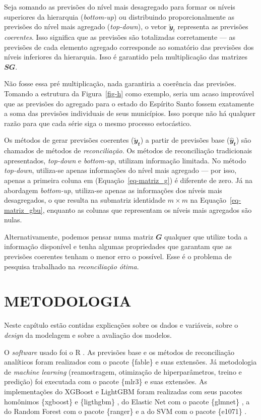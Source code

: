 \documentclass[
  12pt,
  twoside,
  openright,
  a4paper,
  chapter=TITLE,
  section=TITLE,
  brazil]{abntex2}
\begin{document}
Seja somando as previsões do nível mais desagregado para formar os
níveis superiores da hierarquia (\emph{bottom-up}) ou distribuindo
proporcionalmente as previsões do nível mais agregado (\emph{top-down}),
o vetor \(\mathbfit{\tilde{y}}_t\) representa as previsões
\emph{coerentes}. Isso significa que as previsões são totalizadas
corretamente --- as previsões de cada elemento agregado corresponde ao
somatório das previsões dos níveis inferiores da hierarquia. Isso é
garantido pela multiplicação das matrizes \(\mathbfit{SG}\).

Não fosse essa pré multiplicação, nada garantiria a coerência das
previsões. Tomando a estrutura da Figura~\ref{fig-h} como exemplo, seria
um acaso improvável que as previsões do agregado para o estado do
Espírito Santo fossem exatamente a soma das previsões individuais de
seus municípios. Isso porque não há qualquer razão para que cada série
siga o mesmo processo estocástico.

Os métodos de gerar previsões coerentes (\(\mathbfit{\tilde{y}_t}\)) a
partir de previsões base (\(\mathbfit{\hat{y}_t}\)) são chamados de
métodos de \emph{reconciliação}. Os métodos de reconciliação
tradicionais apresentados, \emph{top-down} e \emph{bottom-up}, utilizam
informação limitada. No método \emph{top-down}, utiliza-se apenas
informações do nível mais agregado --- por isso, apenas a primeira
coluna em (Equação~\ref{eq-matriz_g}) é diferente de zero. Já na
abordagem \emph{bottom-up}, utiliza-se apenas as informações dos níveis
mais desagregados, o que resulta na submatriz identidade \(m \times m\)
na Equação~\ref{eq-matriz_gbu}, enquanto as colunas que representam os
níveis mais agregados são nulas.

Alternativamente, podemos pensar numa matriz \(\mathbfit{G}\) qualquer
que utilize toda a informação disponível e tenha algumas propriedades
que garantam que as previsões coerentes tenham o menor erro o possível.
Esse é o problema de pesquisa trabalhado na \emph{reconciliação ótima}.

\section{METODOLOGIA}\label{metodologia}

Neste capítulo estão contidas explicações sobre os dados e variáveis,
sobre o \emph{design} da modelagem e sobre a avaliação dos modelos.

O \emph{software} usado foi o R \autocite{R-base}. As previsões base e
os métodos de reconciliação analíticos foram realizados com o pacote
\{fable\} \autocite{R-fable} e suas extensões. Já metodologia de
\emph{machine learning} (reamostragem, otimização de hiperparâmetros,
treino e predição) foi executada com o pacote \{mlr3\} \autocite{R-mlr3}
e suas extensões. As implementações do XGBoost e LightGBM foram
realizadas com seus pacotes homônimos \{xgboost\} \autocite{R-xgboost} e
\{ligthgbm\} \autocite{R-lightgbm}, do Elastic Net com o pacote
\{glmnet\} \autocite{R-glmnet}, a do Random Forest com o pacote
\{ranger\} \autocite{R-ranger} e a do SVM com o pacote \{e1071\}
\autocite{R-e1071}.
\end{document}
